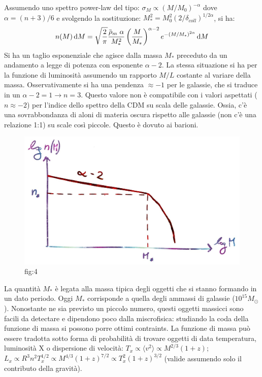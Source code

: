 \vspace{1em}
Assumendo uno spettro power-law del tipo: $\sigma_M\propto (M/M_0)^{-\alpha}$ dove $\alpha = (n+3)/6$ e svolgendo la sostituzione: $M_*^2=M_0^2 (2/\delta_{coll})^{1/2\alpha}$, si ha:
\begin{equation}
    n(M)\d{M}= \sqrt{\frac{2}{\pi}} \frac{\overbar{\rho}_m\; \alpha}{M_*^2}\left(\frac{M}{M_*}\right)^{\alpha -2} e^{-(M/M_*)^{2\alpha}}\d{M}
\end{equation}
Si ha un taglio esponenziale che agisce dalla massa $M_*$ preceduto da un andamento a legge di potenza con esponente $\alpha-2$. La stessa situazione si ha per la funzione di luminosità assumendo un rapporto $M/L$ costante al variare della massa. Osservativamente si ha una pendenza $\approx -1$ per le galassie, che si traduce in un $\alpha -2=1 \to n = 3$. Questo valore non è compatibile con i valori aspettati ($n\approx -2$) per l'indice dello spettro della CDM su scala delle galassie. Ossia, c'è una sovrabbondanza di aloni di materia oscura rispetto alle galassie (non c'è una relazione 1:1) su scale così piccole. Questo è dovuto ai barioni.

\begin{figure}[H]
    \centering
    \includegraphics[width=.75 \textwidth]{Pictures/9/ps.jpg}
    \caption{fig:4}
\end{figure}

La quantità $M_*$ è legata alla massa tipica degli oggetti che si stanno formando in un dato periodo. Oggi $M_*$ corrisponde a quella degli ammassi di galassie ($10^{15}M_\odot$). Nonostante ne sia previsto un piccolo numero, questi oggetti massicci sono facili da detectare e dipendono poco dalla miscrofisica: studiando la coda della funzione di massa si possono porre ottimi contraints. La funzione di massa può essere tradotta sotto forma di probabilità di trovare oggetti di data temperatura, luminosità X o dispersione di velocità: $T_x\propto \langle v^2\rangle \propto M^{2/3}(1+z)$; $L_x \propto R^3 n^2 T_x^{1/2}\propto M^{4/3}(1+z)^{7/2}\propto T_x^2 (1+z)^{3/2}$ (valide assumendo solo il contributo della gravità).  

